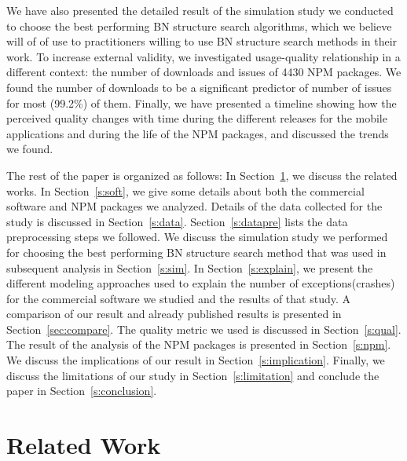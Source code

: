 \documentclass[smallextended]{svjour3}       %
\begin{document}
We have also presented the detailed result of the simulation study
we conducted to choose the best performing BN structure search
algorithms, which we believe will of of use to practitioners willing
to use BN structure search methods in their work. To increase
external validity, we investigated usage-quality relationship in a
different context: the number of downloads and issues of 4430 NPM
packages. We found the number of downloads to be a significant
predictor of number of issues for most (99.2\%) of them. Finally, we
have presented a timeline showing how the perceived quality changes
with time during the different releases for the mobile applications
and during the life of the NPM packages, and discussed the trends we
found.


The rest of the paper is organized as follows: In Section~\ref{s:relwork}, we discuss the related works. In Section~\ref{s:soft}, we give some details about both the commercial software and NPM packages we analyzed. Details of the data collected for the study is discussed in Section~\ref{s:data}. Section~\ref{s:datapre} lists the data preprocessing steps we followed. We discuss the simulation study we performed for choosing the best performing BN structure search method that was used in subsequent analysis in Section~\ref{s:sim}. In Section~\ref{s:explain}, we present the different modeling approaches used to explain the number of exceptions(crashes) for the commercial software we studied and the results of that study. A comparison of our result and already published results is presented in Section~\ref{sec:compare}. 
The quality metric we used is discussed in Section~\ref{s:qual}. The result of the analysis of the NPM packages is presented in Section~\ref{s:npm}. We discuss the implications of our result in Section~\ref{s:implication}. Finally, we discuss the limitations of our study in Section~\ref{s:limitation} and conclude the paper in Section~\ref{s:conclusion}.  

\section{Related Work}\label{s:relwork}
\end{document}
